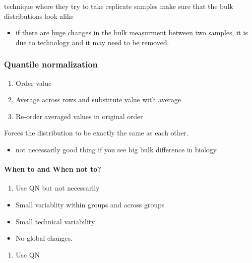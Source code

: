\documentclass[]{article}
\providecommand{\tightlist}{%
  \setlength{\itemsep}{0pt}\setlength{\parskip}{0pt}}
\let\oldparagraph\paragraph
\renewcommand{\paragraph}[1]{\oldparagraph{#1}\mbox{}}
\begin{document}
technique where they try to take replicate samples make sure that the
bulk distributions look alike

\begin{itemize}
\tightlist
\item
  if there are huge changes in the bulk measurment between two samples,
  it is due to technology and it may need to be removed.
\end{itemize}

\subsubsection{Quantile normalization}\label{quantile-normalization}

\begin{enumerate}
\def\labelenumi{\arabic{enumi})}
\tightlist
\item
  Order value
\item
  Average across rows and substitute value with average
\item
  Re-order averaged values in original order
\end{enumerate}

Forces the distribution to be exactly the same as each other.

\begin{itemize}
\tightlist
\item
  not necessarily good thing if you see big bulk difference in biology.
\end{itemize}

\paragraph{When to and When not to?}\label{when-to-and-when-not-to}

\begin{enumerate}
\def\labelenumi{\arabic{enumi}.}
\tightlist
\item
  Use QN but not necessarily
\end{enumerate}

\begin{itemize}
\tightlist
\item
  Small variablity within groups and across groups
\item
  Small technical variability
\item
  No global changes.
\end{itemize}

\begin{enumerate}
\def\labelenumi{\arabic{enumi}.}
\setcounter{enumi}{1}
\tightlist
\item
  Use QN
\end{enumerate}
\end{document}
